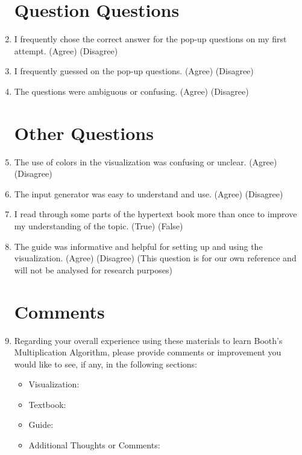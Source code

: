 \documentclass[letter]{article}
\begin{document}
\begin{enumerate}
\section*{Question Questions}

\item I frequently chose  the correct answer for the pop-up questions on my first attempt.
(Agree) (Disagree)

\item I frequently guessed on the pop-up questions.
(Agree) (Disagree)

\item The questions were ambiguous or confusing.
(Agree) (Disagree)

\section*{Other Questions}

\item The use of colors in the visualization was confusing or unclear.
(Agree) (Disagree) %

\item The input generator was easy to understand and use.
(Agree) (Disagree)

\item I read through some parts of the hypertext book more than once to improve my understanding of the topic.
(True) (False)


\item The guide was informative and helpful for setting up and using the visualization.
(Agree) (Disagree) (This question is for our own reference and will not be analysed for research purposes) %

\section*{Comments}

\item Regarding your overall experience using these materials to learn Booth's Multiplication Algorithm, please provide comments or improvement you would like to see, if any, in the following sections:
\begin{itemize}
\item Visualization:
\vspace{.75cm}
\item Textbook:
\vspace{.75cm}
\item Guide:
\vspace{.75cm}
\item Additional Thoughts or Comments:

\end{itemize}

\end{enumerate}
\end{document}
